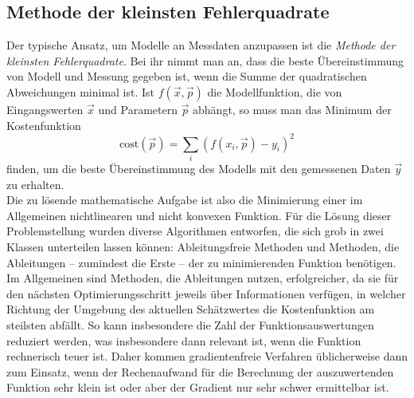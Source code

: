 \documentclass{scrartcl}
\begin{document}
\subsection{Methode der kleinsten Fehlerquadrate}
Der typische Ansatz, um Modelle an Messdaten anzupassen ist die \emph{Methode der kleinsten Fehlerquadrate}. Bei ihr nimmt man an, dass die beste Übereinstimmung von Modell und Messung gegeben ist, wenn die Summe der quadratischen Abweichungen minimal ist. Ist $f(\vec x, \vec p)$ die Modellfunktion, die von Eingangswerten $\vec x$ und Parametern $\vec p$ abhängt, so muss man das Minimum der Kostenfunktion
\begin{equation}
	\text{cost}(\vec p) = \sum_i \left(f(x_i, \vec p)-y_i\right)^2
\end{equation}
finden, um die beste Übereinstimmung des Modells mit den gemessenen Daten $\vec y$ zu erhalten.\\
Die zu lösende mathematische Aufgabe ist also die Minimierung einer im Allgemeinen nichtlinearen und nicht konvexen Funktion. Für die Lösung dieser Problemstellung wurden diverse Algorithmen entworfen, die sich grob in zwei Klassen unterteilen lassen können: Ableitungsfreie Methoden und Methoden, die  Ableitungen -- zumindest die Erste -- der zu minimierenden Funktion benötigen.\\
Im Allgemeinen sind Methoden, die Ableitungen nutzen, erfolgreicher, da sie für den nächsten Optimierungsschritt jeweils über Informationen verfügen, in welcher Richtung der Umgebung des aktuellen Schätzwertes die Kostenfunktion am steilsten abfällt. So kann insbesondere die Zahl der Funktionsauswertungen reduziert werden, was insbesondere dann relevant ist, wenn die Funktion rechnerisch teuer ist. Daher kommen gradientenfreie Verfahren üblicherweise dann zum Einsatz, wenn der Rechenaufwand für die Berechnung der auszuwertenden Funktion sehr klein ist oder aber der Gradient nur sehr schwer ermittelbar ist.
\end{document}
